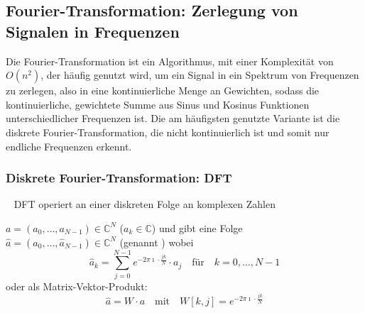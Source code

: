 \subsection{Fourier-Transformation: Zerlegung von Signalen in Frequenzen}
Die Fourier-Transformation ist ein Algorithmus, mit einer Komplexität von \(O\left(n^2\right) \), der häufig genutzt wird, um ein Signal in ein Spektrum von Frequenzen zu zerlegen, also in eine kontinuierliche Menge an Gewichten, sodass die kontinuierliche, gewichtete Summe aus Sinus und Kosinus Funktionen unterschiedlicher Frequenzen ist. Die am häufigsten genutzte Variante ist die diskrete Fourier-Transformation, die nicht kontinuierlich ist und somit nur endliche Frequenzen erkennt. %

\subsubsection{\textbf{Diskrete Fourier-Transformation: DFT}}\label{sec:DFT}~\newline
DFT operiert an einer diskreten Folge an komplexen Zahlen

\(a = (a_0,\dots,a_{N-1}) \in \mathbb{C}^N\) (\(a_k \in \mathbb{C}\)) und gibt eine Folge\\
\(\hat{a} = (\hat{a}_0,\dots,\hat{a}_{N-1}) \in \mathbb{C}^N\) (genannt )
wobei \[\hat{a}_k = \sum_{j=0}^{N-1}e^{-2\pi \imath\cdot\frac{jk}{N}}\cdot a_j \quad \text{für}\quad k = 0,\dots,N-1\] oder als Matrix-Vektor-Produkt: %
\[\hat{a} = W\cdot a \quad \text{mit} \quad W[k,j] = e^{-2\pi \imath \cdot\frac{jk}{N}}\]

